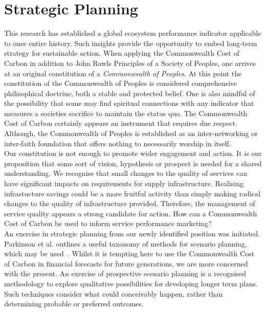 \documentclass[11pt, oneside]{article}   	%
\begin{document}
\section{Strategic Planning}

This research has established a global ecosystem performance indicator applicable to ones entire history.
Such insights provide the opportunity to embed long-term strategy for sustainable action.
When applying the Commonwealth Cost of Carbon in addition to John Rawls Principles of a Society of Peoples, one arrives at an original constitution of a \emph{Commonwealth of Peoples}.
At this point the constitution of the Commonwealth of Peoples is considered comprehensive philisophical doctrine, both a stable and protected belief.
One is also mindful of the possibility that some may find spiritual connections with any indicator that measures a societies sacrifice to maintain the status quo.
The Commonwealth Cost of Carbon certainly appears an instrument that requires due respect.
Although, the Commonwealth of Peoples is established as an inter-networking or inter-faith foundation that offers nothing to necessarily worship in itself.\\

Our constitution is not enough to promote wider engagement and action.
It is our proposition that some sort of vision, hypothesis or prospect is needed for a shared understanding.
We recognise that small changes to the quality of services can have significant impacts on requirements for supply infrastructure.
Realising infrastucture savings could be a more fruitful activity than simply making radical changes to the quality of infrastructure provided.
Therefore, the management of service quality appears a strong candidate for action.
How can a Commonwealth Cost of Carbon be used to inform service performance marketing?\\

An exercise in strategic planning from our newly identified position was initiated.
Parkinson et al. outlines a useful taxonomy of methods for scenario planning, which may be used~\cite{atp1}.
Whilst it is tempting here to use the Commonwealth Cost of Carbon in financial forecasts for future generations, we are more concerned with the present.
An exercise of prospective scenario planning is a recognised methodology to explore qualitative possibilities for developing longer term plans.
Such techniques consider what could conceivably happen, rather than determining probable or preferred outcomes.\\
\end{document}
